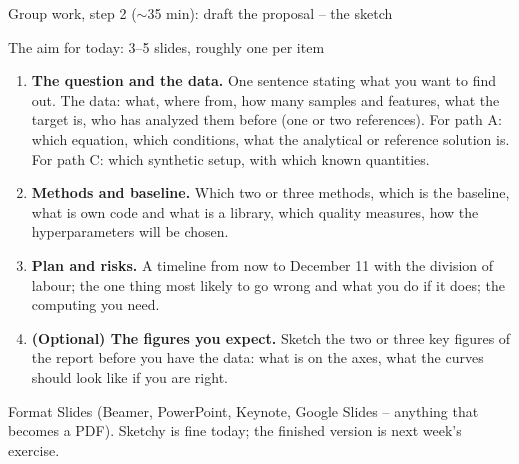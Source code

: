 \documentclass[10pt,aspectratio=169]{beamer}
\begin{document}
\begin{frame}{Group work, step 2 ($\sim$35 min): draft the proposal -- the sketch}
\footnotesize
\begin{block}{The aim for today: 3--5 slides, roughly one per item}
\begin{enumerate}
  \item \textbf{The question and the data.}  One sentence stating what you
        want to find out.  The data: what, where from, how many samples and
        features, what the target is, who has analyzed them before (one or
        two references).  For path A: which equation, which conditions,
        what the analytical or reference solution is.  For path C: which
        synthetic setup, with which known quantities.
  \item \textbf{Methods and baseline.}  Which two or three methods, which
        is the baseline, what is own code and what is a library, which
        quality measures, how the hyperparameters will be chosen.
  \item \textbf{Plan and risks.}  A timeline from now to December 11 with
        the division of labour; the one thing most likely to go wrong and
        what you do if it does; the computing you need.
  \item \textbf{(Optional) The figures you expect.}  Sketch the two or three
        key figures of the report before you have the data: what is on the
        axes, what the curves should look like if you are right.
\end{enumerate}
\end{block}
\begin{block}{Format}
Slides (Beamer, PowerPoint, Keynote, Google Slides -- anything that becomes
a PDF).  Sketchy is fine today; the finished version is next week's
exercise.
\end{block}
\end{frame}
\end{document}
